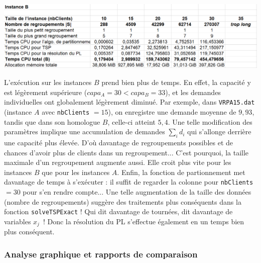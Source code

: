 \documentclass[french, 11pt, a4paper]{article} %
\newcommand{\smb}{\smallbreak}
\begin{document}
\begin{center}
    \includegraphics[scale=0.55]{ResExacte_InstB.PNG}
\end{center}

L'exécution sur les instances $B$ prend bien plus de temps. En effet, la capacité y est légèrement supérieure ($capa_A = 30 < capa_B = 33$), et les demandes individuelles ont globalement légèrement diminué.
Par exemple, dans \verb+VRPA15.dat+ (instance $A$ avec \verb+nbClients+ $=15$), on enregistre une demande moyenne de $9,93$,
tandis que dans son homologue $B$, celle-ci atteint $5,4$.
\smb Une telle modification des paramètres implique une accumulation de demandes $\sum_i d_i$ qui s’allonge derrière une capacité plus élevée. D’où davantage de regroupements possibles et de chances d'avoir plus de clients dans un regroupement...
C'est pourquoi, la taille maximale d’un regroupement augmente aussi. Elle croit plus vite pour les instances $B$ que pour les instances $A$.
\smb Enfin, la fonction de partionnement met davantage de temps à s’exécuter : il suffit de regarder la colonne pour \verb+nbClients+ $=30$ pour s’en rendre compte...
Une telle augmentation de la taille des données (nombre de regroupements) suggère des traitements plus conséquents dans la fonction \verb+solveTSPExact+ !
Qui dit davantage de tournées, dit davantage de variables $x_j$ ! Donc la résolution du PL s’effectue également en un temps bien plus conséquent.

\subsubsection{Analyse graphique et rapports de comparaison}
\end{document}
